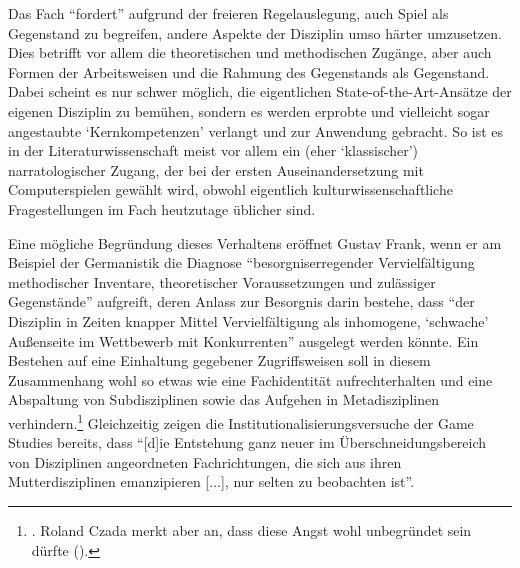 \documentclass{scrartcl}
\begin{document}
Das Fach \enquote{fordert} aufgrund der freieren Regelauslegung, auch Spiel als Gegenstand zu begreifen, andere Aspekte der Disziplin umso härter umzusetzen.
Dies betrifft vor allem die theoretischen und methodischen Zugänge, aber auch Formen der Arbeitsweisen und die Rahmung des Gegenstands als Gegenstand.
Dabei scheint es nur schwer möglich, die eigentlichen State-of-the-Art-Ansätze der eigenen Disziplin zu bemühen, sondern es werden erprobte und vielleicht sogar angestaubte \enquote*{Kernkompetenzen} verlangt und zur Anwendung gebracht.
So ist es in der Literaturwissenschaft meist vor allem ein (eher \enquote*{klassischer}) narratologischer Zugang, der bei der ersten Auseinandersetzung mit Computerspielen gewählt wird, obwohl eigentlich kulturwissenschaftliche Fragestellungen im Fach heutzutage üblicher sind.

Eine mögliche Begründung dieses Verhaltens eröffnet Gustav Frank, wenn er am Beispiel der Germanistik die Diagnose \enquote{besorgniserregender Vervielfältigung methodischer Inventare, theoretischer Voraussetzungen und zulässiger Gegenstände} aufgreift, deren Anlass zur Besorgnis darin bestehe, dass \enquote{der Disziplin in Zeiten knapper Mittel Vervielfältigung als inhomogene, \enquote{schwache} Außenseite im Wettbewerb mit Konkurrenten} ausgelegt werden könnte.\autocite[][S.~61]{frank_problemlosen_2000}
Ein Bestehen auf eine Einhaltung gegebener Zugriffsweisen soll in diesem Zusammenhang wohl so etwas wie eine Fachidentität aufrechterhalten und eine Abspaltung von Subdisziplinen sowie das Aufgehen in Metadisziplinen verhindern.\footnote{\autocite[Vgl.][S.~76]{frank_problemlosen_2000}. Roland Czada merkt aber an, dass diese Angst wohl unbegründet sein dürfte (\autocite[vgl.][S.~39]{czada_disziplinare_2002}).}
Gleichzeitig zeigen die Institutionalisierungsversuche der Game Studies bereits, dass \enquote{[d]ie Entstehung ganz neuer im Überschneidungsbereich von Disziplinen angeordneten Fachrichtungen, die sich aus ihren Mutterdisziplinen emanzipieren [$\ldots$], nur selten zu beobachten ist}.\autocite[][S.~26]{czada_disziplinare_2002}
\end{document}
